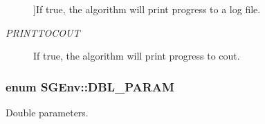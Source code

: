 \begin{Desc}
\begin{description}
{}]If true, the algorithm will print progress to a log file. \item[{\em 
\hypertarget{classSGEnv_acff56acdb55b7734c7bc63c5ddf6af90aa5dbef92e15cf4e4a0a2ff95adfe5992}{P\-R\-I\-N\-T\-T\-O\-C\-O\-U\-T}\label{classSGEnv_acff56acdb55b7734c7bc63c5ddf6af90aa5dbef92e15cf4e4a0a2ff95adfe5992}
}]If true, the algorithm will print progress to cout. \end{description}
\end{Desc}
\hypertarget{classSGEnv_add4d052ff3e3d09a2113e0ebd032eba3}{
\subsubsection[{D\-B\-L\-\_\-\-P\-A\-R\-A\-M}]{\setlength{\rightskip}{0pt plus 5cm}enum {\bf S\-G\-Env\-::\-D\-B\-L\-\_\-\-P\-A\-R\-A\-M}}}\label{classSGEnv_add4d052ff3e3d09a2113e0ebd032eba3}


Double parameters. 

